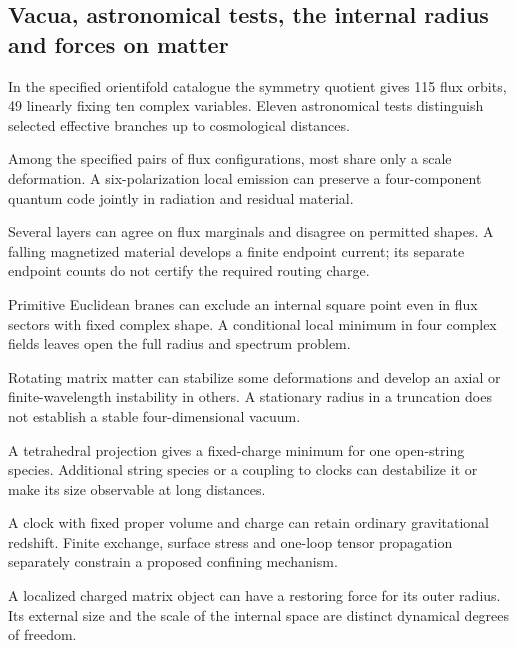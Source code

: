 \subsection{Vacua, astronomical tests, the internal radius and forces on matter}
\begin{description}\small
\setlength{\itemsep}{.25em}\setlength{\parskip}{0pt}
\item[\textnormal{\texttt{RES-0168}}] In the specified orientifold catalogue the symmetry quotient gives 115 flux orbits, 49 linearly fixing ten complex variables. Eleven astronomical tests distinguish selected effective branches up to cosmological distances.
\item[\textnormal{\texttt{RES-0169}}] Among the specified pairs of flux configurations, most share only a scale deformation. A six-polarization local emission can preserve a four-component quantum code jointly in radiation and residual material.
\item[\textnormal{\texttt{RES-0170}}] Several layers can agree on flux marginals and disagree on permitted shapes. A falling magnetized material develops a finite endpoint current; its separate endpoint counts do not certify the required routing charge.
\item[\textnormal{\texttt{RES-0171}}] Primitive Euclidean branes can exclude an internal square point even in flux sectors with fixed complex shape. A conditional local minimum in four complex fields leaves open the full radius and spectrum problem.
\item[\textnormal{\texttt{RES-0172}}] Rotating matrix matter can stabilize some deformations and develop an axial or finite-wavelength instability in others. A stationary radius in a truncation does not establish a stable four-dimensional vacuum.
\item[\textnormal{\texttt{RES-0173}}] A tetrahedral projection gives a fixed-charge minimum for one open-string species. Additional string species or a coupling to clocks can destabilize it or make its size observable at long distances.
\item[\textnormal{\texttt{RES-0174}}] A clock with fixed proper volume and charge can retain ordinary gravitational redshift. Finite exchange, surface stress and one-loop tensor propagation separately constrain a proposed confining mechanism.
\item[\textnormal{\texttt{RES-0175}}] A localized charged matrix object can have a restoring force for its outer radius. Its external size and the scale of the internal space are distinct dynamical degrees of freedom.

\end{description}
